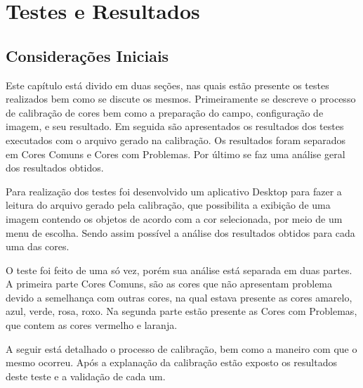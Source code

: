 % 
\chapter{Testes e Resultados} 
\section{Considerações Iniciais}
Este capítulo está divido em duas seções, nas quais estão presente os testes realizados bem como se discute os mesmos. Primeiramente se descreve o processo de calibração de cores bem como a preparação do campo, configuração de imagem, e seu resultado. Em seguida são apresentados os resultados dos testes executados com o arquivo gerado na calibração. Os resultados foram separados em Cores Comuns e Cores com Problemas. Por último se faz uma análise geral dos resultados obtidos.


 Para realização dos testes foi desenvolvido um aplicativo Desktop para fazer a leitura do arquivo gerado pela calibração, que possibilita a exibição de uma imagem contendo os objetos de acordo com a cor selecionada, por meio de um menu de escolha. Sendo assim possível a análise dos resultados obtidos para cada uma das cores. 
 
  O teste foi feito de uma só vez, porém sua análise está separada em duas partes. A primeira parte Cores Comuns, são as cores que não apresentam problema devido a semelhança com outras cores, na qual estava presente as cores amarelo, azul, verde, rosa, roxo. Na segunda parte estão presente as Cores com Problemas, que contem as cores vermelho e laranja. 
 
 A seguir está detalhado o processo de calibração, bem como a maneiro com que o mesmo ocorreu. Após a explanação da calibração estão exposto os resultados deste teste e a validação de cada um.
